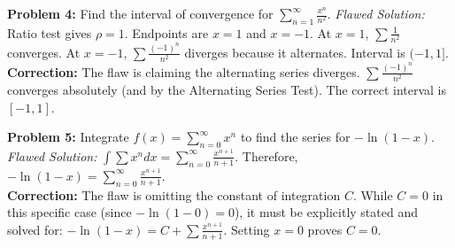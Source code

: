 \documentclass[11pt, letterpaper]{article}
\theoremstyle{definition}
\theoremstyle{remark}
\begin{document}
\textbf{Problem 4:} Find the interval of convergence for $\sum_{n=1}^{\infty} \frac{x^n}{n^2}$.
\textit{Flawed Solution:} Ratio test gives $\rho = 1$. Endpoints are $x=1$ and $x=-1$. At $x=1$, $\sum \frac{1}{n^2}$ converges. At $x=-1$, $\sum \frac{(-1)^n}{n^2}$ diverges because it alternates. Interval is $( -1, 1 ]$.
\\[6pt]
\textbf{Correction:} The flaw is claiming the alternating series diverges. $\sum \frac{(-1)^n}{n^2}$ converges absolutely (and by the Alternating Series Test). The correct interval is $[ -1, 1 ]$.

\textbf{Problem 5:} Integrate $f(x) = \sum_{n=0}^{\infty} x^n$ to find the series for $-\ln(1-x)$.
\textit{Flawed Solution:} $\int \sum x^n dx = \sum_{n=0}^{\infty} \frac{x^{n+1}}{n+1}$. Therefore, $-\ln(1-x) = \sum_{n=0}^{\infty} \frac{x^{n+1}}{n+1}$.
\\[6pt]
\textbf{Correction:} The flaw is omitting the constant of integration $C$. While $C=0$ in this specific case (since $-\ln(1-0) = 0$), it must be explicitly stated and solved for: $-\ln(1-x) = C + \sum \frac{x^{n+1}}{n+1}$. Setting $x=0$ proves $C=0$.
\end{document}
